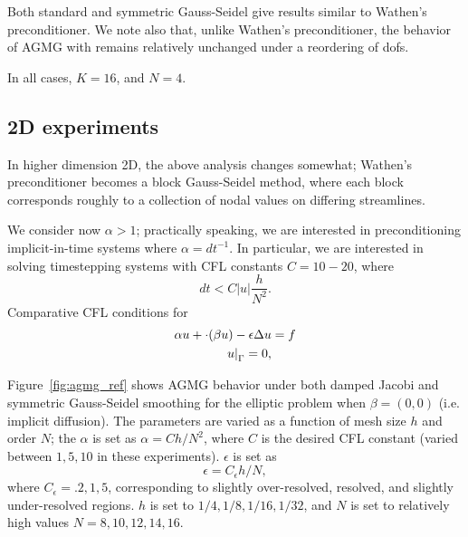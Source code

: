 \documentclass[final,leqno]{siamltex}
\newcommand{\LRb}[1]{\left| #1 \right|}
\let\grad\relax
\newcommand{\grad}{\nabla}
\renewcommand{\div}{\grad \cdot}
\begin{document}
Both standard and symmetric Gauss-Seidel give results similar to Wathen's preconditioner.  We note also that, unlike Wathen's preconditioner, the behavior of AGMG with remains relatively unchanged under a reordering of dofs.  

In all cases, $K = 16$, and $N=4$.  

\subsection{2D experiments}

In higher dimension 2D, the above analysis changes somewhat; Wathen's preconditioner becomes a block Gauss-Seidel method, where each block corresponds roughly to a collection of nodal values on differing streamlines.  

We consider now $\alpha > 1$; practically speaking, we are interested in preconditioning implicit-in-time systems where $\alpha = dt^{-1}$.  In particular, we are interested in solving timestepping systems with CFL constants $C=10-20$, where 
\[
dt < C\LRb{u}\frac{h}{N^2}.
\]
Comparative CFL conditions for 
\begin{align*}
\alpha u + \div(\beta u) - \epsilon \Delta u &= f\\
\left.u\right|_{\Gamma} = 0,
\end{align*}

Figure~\ref{fig:agmg_ref} shows AGMG behavior under both damped Jacobi and symmetric Gauss-Seidel smoothing for the elliptic problem when $\beta = (0,0)$ (i.e. implicit diffusion).  The parameters are varied as a function of mesh size $h$ and order $N$; the $\alpha$ is set as $\alpha = C h/N^2$, where $C$ is the desired CFL constant (varied between $1, 5, 10$ in these experiments).  $\epsilon$ is set as 
\[
\epsilon = C_\epsilon h/N,
\]
where $C_\epsilon = .2, 1, 5$, corresponding to slightly over-resolved, resolved, and slightly under-resolved regions.  $h$ is set to $1/4, 1/8, 1/16, 1/32$, and $N$ is set to relatively high values $N = 8, 10, 12, 14, 16$.   
\end{document}
